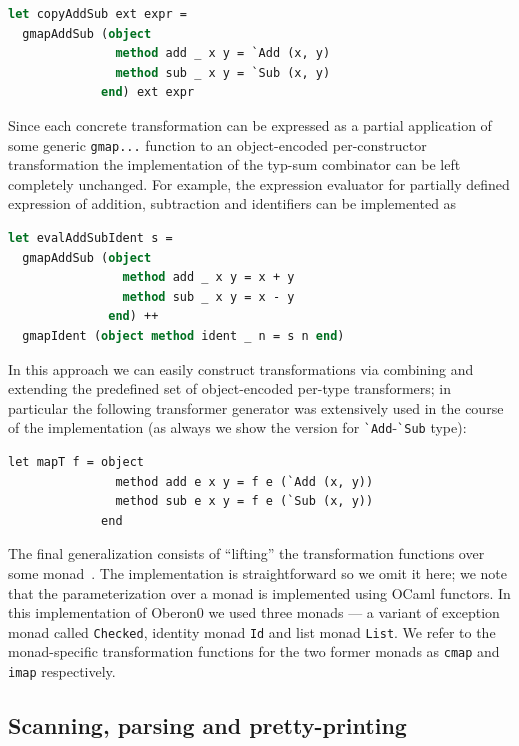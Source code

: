 \begin{lstlisting}[language=ocaml]
let copyAddSub ext expr =
  gmapAddSub (object
               method add _ x y = `Add (x, y)
               method sub _ x y = `Sub (x, y)
             end) ext expr
\end{lstlisting}

Since each concrete transformation can be expressed as a partial application of
some generic \lstinline{gmap...} function to an object-encoded per-constructor
transformation the implementation of the typ-sum combinator can be left completely 
unchanged. For example, the expression evaluator for partially defined expression
of addition, subtraction and identifiers can be implemented as

\begin{lstlisting}[language=ocaml]
let evalAddSubIdent s = 
  gmapAddSub (object
                method add _ x y = x + y
                method sub _ x y = x - y
              end) ++
  gmapIdent (object method ident _ n = s n end)
\end{lstlisting}

In this approach we can easily construct transformations via combining and
extending the predefined set of object-encoded per-type transformers; in 
particular the following transformer generator was extensively used in the course
of the implementation (as always we show the version for \lstinline{`Add}-\lstinline{`Sub}
type):

\begin{lstlisting}
let mapT f = object
               method add e x y = f e (`Add (x, y))
               method sub e x y = f e (`Sub (x, y))
             end
\end{lstlisting}

The final generalization consists of ``lifting'' the transformation functions
over some monad~\cite{Monads}. The implementation is straightforward so we omit it
here; we note that the parameterization over a monad is implemented using OCaml functors. 
In this implementation of Oberon0 we used three monads --- a variant 
of exception monad called \lstinline{Checked}, identity monad \lstinline{Id} and list 
monad \lstinline{List}. We refer to the monad-specific transformation functions for 
the two former monads as \lstinline{cmap} and \lstinline{imap} respectively.

\subsection{Scanning, parsing and pretty-printing}

